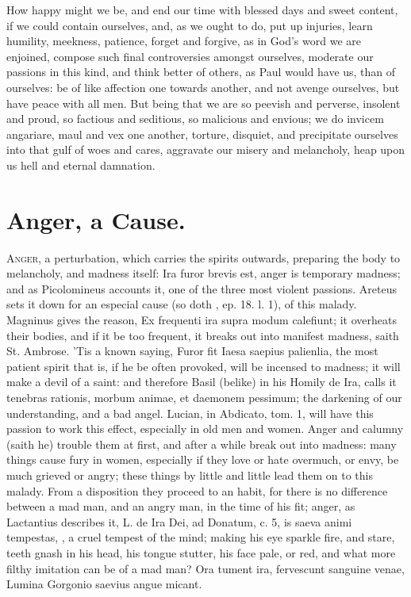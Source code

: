 {{How happy might we be, and end our time with blessed days and sweet
content, if we could contain ourselves, and, as we ought to do, put up
injuries, learn humility, meekness, patience, forget and forgive, as in
God's word we are enjoined, compose such final controversies
amongst ourselves, moderate our passions in this kind, and think better
of others, as Paul would have us, than of ourselves: be of like
affection one towards another, and not avenge ourselves, but have peace
with all men. But being that we are so peevish and perverse, insolent
and proud, so factious and seditious, so malicious and envious; we do
invicem angariare, maul and vex one another, torture, disquiet, and
precipitate ourselves into that gulf of woes and cares, aggravate our
misery and melancholy, heap upon us hell and eternal damnation.

\section{Anger, a Cause.}

\lettrine{A}{nger}, a perturbation, which carries the spirits outwards, preparing
the body to melancholy, and madness itself: Ira furor brevis est, anger
is temporary madness; and as Picolomineus accounts it, one of the
three most violent passions. Areteus sets it down for an especial
cause (so doth \Seneca, ep. 18. l. 1), of this malady. Magninus
gives the reason, Ex frequenti ira supra modum calefiunt; it overheats
their bodies, and if it be too frequent, it breaks out into manifest
madness, saith St. Ambrose. 'Tis a known saying, Furor fit Iaesa
saepius palienlia, the most patient spirit that is, if he be often
provoked, will be incensed to madness; it will make a devil of a saint:
and therefore Basil (belike) in his Homily de Ira, calls it tenebras
rationis, morbum animae, et daemonem pessimum; the darkening of our
understanding, and a bad angel. Lucian, in Abdicato, tom. 1, will
have this passion to work this effect, especially in old men and women.
Anger and calumny (saith he) trouble them at first, and after a while
break out into madness: many things cause fury in women, especially if
they love or hate overmuch, or envy, be much grieved or angry; these
things by little and little lead them on to this malady. From a
disposition they proceed to an habit, for there is no difference
between a mad man, and an angry man, in the time of his fit; anger, as
Lactantius describes it, L. de Ira Dei, ad Donatum, c. 5, is
saeva animi tempestas, \etc{}, a cruel tempest of the mind; making
his eye sparkle fire, and stare, teeth gnash in his head, his tongue
stutter, his face pale, or red, and what more filthy imitation can be
of a mad man?
Ora tument ira, fervescunt sanguine venae,
Lumina Gorgonio saevius angue micant.

}}
